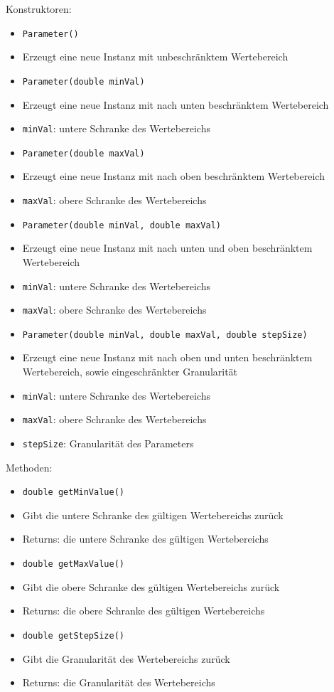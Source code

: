 \documentclass[parskip=full,11pt]{scrartcl}
\begin{document}
Konstruktoren:
\begin{itemize}\itemsep -10pt
	\item \texttt{Parameter()}
	\item[] Erzeugt eine neue Instanz mit unbeschränktem Wertebereich 
	\item \texttt{Parameter(double minVal)}
	\item[] Erzeugt eine neue Instanz mit nach unten beschränktem Wertebereich
	\item[] \texttt{minVal}: untere Schranke des Wertebereichs
	\item \texttt{Parameter(double maxVal)}
	\item[] Erzeugt eine neue Instanz mit nach oben beschränktem Wertebereich
	\item[] \texttt{maxVal}: obere Schranke des Wertebereichs
	\item \texttt{Parameter(double minVal, double maxVal)}
	\item[] Erzeugt eine neue Instanz mit nach unten und oben beschränktem Wertebereich
	\item[] \texttt{minVal}: untere Schranke des Wertebereichs
	\item[] \texttt{maxVal}: obere Schranke des Wertebereichs
	\item \texttt{Parameter(double minVal, double maxVal, double stepSize)}
	\item[] Erzeugt eine neue Instanz mit nach oben und unten beschränktem Wertebereich, sowie eingeschränkter Granularität
	\item[] \texttt{minVal}: untere Schranke des Wertebereichs
	\item[] \texttt{maxVal}: obere Schranke des Wertebereichs
	\item[] \texttt{stepSize}: Granularität des Parameters
	
\end{itemize}

Methoden:

\begin{itemize}\itemsep -10pt
	\item \texttt{double getMinValue()}
	\item[] Gibt die untere Schranke des gültigen Wertebereichs zurück
	\item[] Returns: die untere Schranke des gültigen Wertebereichs
	\item \texttt{double getMaxValue()}
	\item[] Gibt die obere Schranke des gültigen Wertebereichs zurück
	\item[]Returns: die obere Schranke des gültigen Wertebereichs
	\item \texttt{double getStepSize()}
	\item[] Gibt die Granularität des Wertebereichs zurück
	\item[]Returns: die Granularität des Wertebereichs
\end{itemize}
\end{document}
